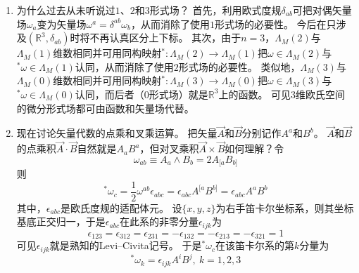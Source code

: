 \begin{enumerate}[（1）]
    \item 为什么过去从未听说过$1$、$2$和$3$形式场？
    首先，利用欧式度规$\delta_{ab}$可把对偶矢量场$\omega_a$变为矢量场$\omega^a = \delta^{ab}\omega_b$，从而消除了使用$1$形式场的必要性。
    今后在只涉及$(\mathbb{R}^3, \delta_{ab})$时将不再认真区分上下标。
    其次，由于$n = 3$，$\Lambda_M(2)$与$\Lambda_M(1)$维数相同并可用同构映射$^* \colon \Lambda_M(2) \to \Lambda_M(1)$把$\omega \in \Lambda_M(2)$与$^*\omega \in \Lambda_M(1)$认同，从而消除了使用$2$形式场的必要性。
    类似地，$\Lambda_M(3)$与$\Lambda_M(0)$维数相同并可用同构映射$^* \colon \Lambda_M(3) \to \Lambda_M(0)$把$\omega \in \Lambda_M(3)$与$^*\omega \in \Lambda_M(0)$认同，而后者（$0$形式场）就是$\mathbb{R}^3$上的函数。
    可见$3$维欧氏空间的微分形式场都可由函数和矢量场代替。
    \item 现在讨论矢量代数的点乘和叉乘运算。
    把矢量$\vec A$和$\vec B$分别记作$A^a$和$B^b$。
    $\vec A$和$\vec B$的点乘积$\vec A \cdot \vec B$自然就是$A_aB^a$，但对叉乘积$\vec A \times \vec B$如何理解？令
    $$\omega_{ab} \equiv A_a \wedge B_b = 2A_{[a}B_{b]}$$
    则
    $$^*\omega_c = \frac{1}{2}\omega^{ab}\epsilon_{abc} = \epsilon_{abc}A^{[a}B^{b]} = \epsilon_{abc}A^{a}B^{b}$$
    其中，$\epsilon_{abc}$是欧氏度规的适配体元。
    设$\{x, y, z\}$为右手笛卡尔坐标系，则其坐标基底正交归一，于是$\epsilon_{abc}$在此系的非零分量$\epsilon_{ijk}$为
    $$\epsilon_{123} = \epsilon_{312} = \epsilon_{231} = -\epsilon_{132} = -\epsilon_{213} = -\epsilon_{321} = 1$$
    可见$\epsilon_{ijk}$就是熟知的Levi--Civita记号。
    于是$^*\omega_c$在该笛卡尔系的第$k$分量为
    $$^*\omega_k = \epsilon_{ijk}A^iB^j, ~ k = 1, 2, 3$$
\end{enumerate}

